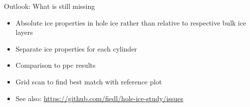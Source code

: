 
\begin{frame}{Outlook: What is still missing}
  \begin{itemize}
    \item Absolute ice properties in hole ice rather than relative to respective bulk ice layers
    \item Separate ice properties for each cylinder
    \item Comparison to ppc results
    \item Grid scan to find best match with reference plot
    \item See also: \url{https://github.com/fiedl/hole-ice-study/issues}
  \end{itemize}
\end{frame}
